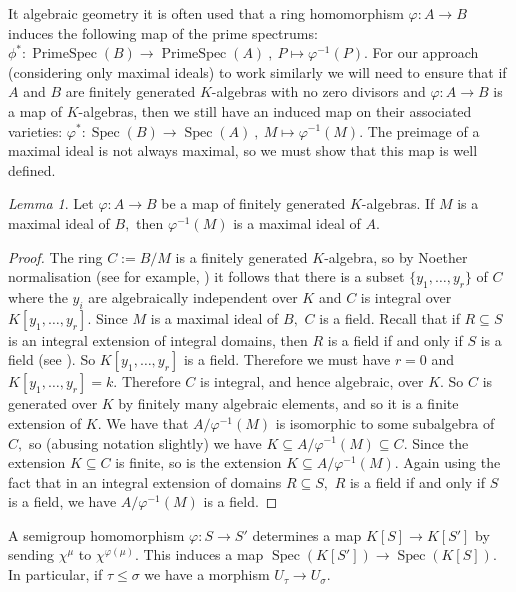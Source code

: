 \documentclass[BSc]{usydthesis}
\numberwithin{equation}{chapter}
\theoremstyle{remark}
\newtheorem{Lemma}[equation]{Lemma}
\DeclareMathOperator{\Spec}{Spec}
\begin{document}
It algebraic geometry it is often used that a ring homomorphism $\varphi: A \to B$ induces the following map of the prime spectrums: $\phi^*: \operatorname{PrimeSpec}(B) \to \operatorname{PrimeSpec}(A) \ , \ P \mapsto \varphi^{-1}(P).$ For our  approach (considering only maximal ideals) to work similarly we will need to ensure that if $A$ and $B$ are finitely generated $K$-algebras with no zero divisors and $\varphi:A\to B$ is a map of $K$-algebras, then we still have an induced map on their associated varieties: $\varphi^*: \Spec(B) \to \Spec(A) \ , \ M \mapsto \varphi^{-1}(M).$ The preimage of a maximal ideal is not always maximal, so we must show that this map is well defined. 

\begin{Lemma}\label{Max}
 Let $\varphi:A\to B$ be a map of finitely generated $K$-algebras. If $M$ is a maximal ideal of $B,$ then $\varphi^{-1}(M)$ is a maximal ideal of $A.$
\end{Lemma}

\begin{proof}
The ring $C:= B/M$ is a finitely generated $K$-algebra, so by Noether normalisation (see for example, \cite[Page.~ 63, \S 4.6]{Reid:Algebra}) it follows that there is a subset $\{ y_1, \ldots, y_r\}$ of $C$ where the $y_i$ are algebraically independent over $K$ and $C$ is integral over $K[y_1,\ldots, y_r].$ Since $M$ is a maximal ideal of $B,$ $C$ is a field. Recall that if $R\subseteq S$ is an integral extension of integral domains, then $R$ is a field if and only if $S$ is a field (see \cite[Page.~ 66, \S 4.9]{Reid:Algebra}). So $K[y_1,\ldots, y_r]$ is a field. Therefore we must have $r=0$ and $K[y_1,\ldots, y_r]=k.$ Therefore $C$ is integral, and hence algebraic, over $K.$ So $C$ is generated over $K$ by finitely many algebraic elements, and so it is a finite extension of $K.$ We have that $A/\varphi^{-1}(M)$ is isomorphic to some subalgebra of $C,$ so (abusing notation slightly) we have $K\subseteq A/\varphi^{-1}(M) \subseteq C.$ Since the extension $K\subseteq C$ is finite, so is the extension $K\subseteq A/\varphi^{-1}(M).$ Again using the fact that in an integral extension of domains $R\subseteq S,$ $R$ is a field if and only if $S$ is a field, we have $A/\varphi^{-1}(M)$ is a field. 
\end{proof}

A semigroup homomorphism $\varphi: S \to S'$ determines a map $K[S] \to K[S']$ by sending $\chi^{\mu}$ to $\chi^{\varphi (\mu)}.$ This induces a map $\Spec (K[S']) \to \Spec (K[S]).$ In particular, if $\tau \leq \sigma$ we have a morphism $U_{\tau} \to U_{\sigma}.$
\end{document}
